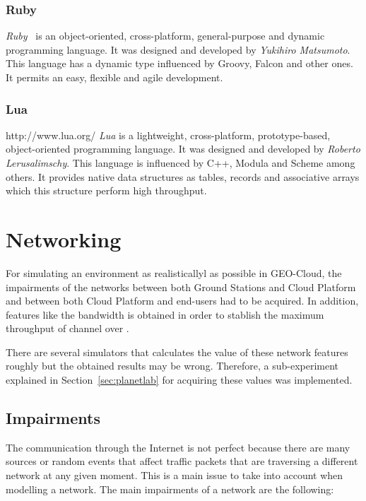 \subsubsection{Ruby}
\emph{Ruby}~\cite{Community} is an object-oriented, cross-platform, general-purpose and dynamic
programming language. It was designed and developed by \emph{Yukihiro
  Matsumoto}. This language has a dynamic type influenced by Groovy, Falcon and
other ones. It permits an easy, flexible and agile development.


\subsubsection{Lua}
http://www.lua.org/
\emph{Lua} is a lightweight, cross-platform, prototype-based, object-oriented programming
language. It was designed and developed by \emph{Roberto Lerusalimschy}. This
language is influenced by C++, Modula and Scheme among others. It provides
native data structures as tables, records and associative arrays which this
structure perform high throughput.


\section{Networking}

For simulating an environment as realisticallyl as possible in GEO-Cloud, the impairments  of the networks between both Ground Stations and Cloud Platform
and between both Cloud Platform and end-users had to be acquired. In addition, features
like the bandwidth is obtained in order to stablish the maximum throughput of
channel over \vw.

There are several simulators that
calculates the value of these network features roughly but the obtained results
may be wrong. Therefore, a sub-experiment explained in
Section~\ref{sec:planetlab} for acquiring these values was implemented.

\subsection{Impairments}

The communication through the Internet is not perfect because there are many
sources or random events that affect traffic packets that are traversing a
different network  at any given moment. This is a main issue to take into
account when modelling a network. The main
impairments
 of a network are the following:

